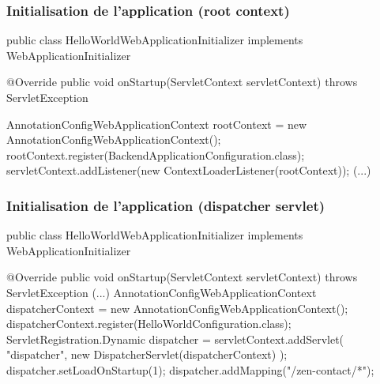 \begin{frame}[fragile]
 \frametitle{Initialisation de l'application (root context)}
 
 \begin{javacode}
public class HelloWorldWebApplicationInitializer
       implements WebApplicationInitializer {

  @Override
  public void onStartup(ServletContext servletContext)
              throws ServletException {

    AnnotationConfigWebApplicationContext rootContext =
      new AnnotationConfigWebApplicationContext();
    rootContext.register(BackendApplicationConfiguration.class);
    servletContext.addListener(new ContextLoaderListener(rootContext));
    (...)
  }

}
 \end{javacode}
 
\end{frame}

\begin{frame}[fragile]
 \frametitle{Initialisation de l'application (dispatcher servlet)}
 
 \begin{javacode}
public class HelloWorldWebApplicationInitializer
       implements WebApplicationInitializer {

  @Override
  public void onStartup(ServletContext servletContext)
              throws ServletException {
    (...)
    AnnotationConfigWebApplicationContext dispatcherContext =
      new AnnotationConfigWebApplicationContext();
    dispatcherContext.register(HelloWorldConfiguration.class);
    ServletRegistration.Dynamic dispatcher = servletContext.addServlet(
      "dispatcher", new DispatcherServlet(dispatcherContext)
    );
    dispatcher.setLoadOnStartup(1);
    dispatcher.addMapping("/zen-contact/*");
  }

}
 \end{javacode}
 
\end{frame}
